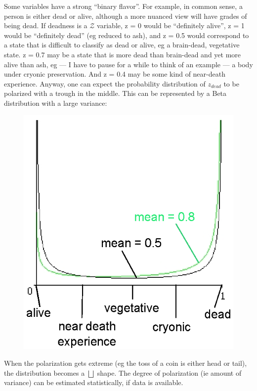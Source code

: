 Some variables have a strong ``binary flavor''.  For example, in common sense, a person is either dead or alive, although a more nuanced view will have grades of being dead.  If deadness is a $\mathcal{Z}$ variable, z = 0 would be ``definitely alive'', z = 1 would be ``definitely dead'' (eg reduced to ash), and z = 0.5 would correspond to a state that is difficult to classify as dead or alive, eg a brain-dead, vegetative state.  z = 0.7 may be a state that is more dead than brain-dead and yet more alive than ash, eg --- I have to pause for a while to think of an example --- a body under cryonic preservation.  And z = 0.4 may be some kind of near-death experience.  Anyway, one can expect the probability distribution of $z_{dead}$ to be polarized with a trough in the middle.  This can be represented by a Beta distribution with a large variance:
\begin{figure}[H]
\centering
\includegraphics{deadness.ps}
\end{figure}
When the polarization gets extreme (eg the toss of a coin is either head or tail), the distribution becomes a $\bigsqcup$ shape.  The degree of polarization (ie amount of variance) can be estimated statistically, if data is available.

